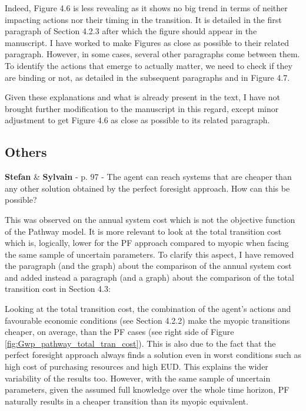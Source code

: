 \documentclass[12pt,a4paper]{article}
\begin{document}
\noindent Indeed, Figure 4.6 is less revealing as it shows no big trend in terms of neither impacting actions nor their timing in the transition.  It is detailed in the first paragraph of Section 4.2.3 after which the figure should appear in the manuscript. I have worked to make Figures as close as possible to their related paragraph. However, in some cases, several other paragraphs come between them. To identify the actions that emerge to actually matter, we need to check if they are binding or not, as detailed in the subsequent paragraphs and in Figure 4.7.

Given these explanations and what is already present in the text, I have not brought further modification to the manuscript in this regard, except minor adjustment to get Figure 4.6 as close as possible to its related paragraph.


\subsection{Others}

\begin{mdframed}[style=comment] %
{\color{teal} \textbf{Stefan}} \& {\color{purple} \textbf{Sylvain}} - p. 97 - The agent can reach systems that are cheaper than any other solution obtained by the perfect foresight approach. How can this be possible?
\end{mdframed}

\noindent This was observed on the annual system cost which is not the objective function of the Pathway model. It is more relevant to look at the total transition cost which is, logically, lower for the PF approach compared to myopic when facing the same sample of uncertain parameters. To clarify this aspect, I have removed the paragraph (and the graph) about the comparison of the annual system cost and added instead a paragraph (and a graph) about the comparison of the total transition cost {\color{blue}in Section 4.3}:

\begin{mdframed}[style=manuscript] %
Looking at the total transition cost, the combination of the agent's actions and favourable economic conditions (see Section 4.2.2) make the myopic transitions cheaper, on average, than the PF cases (see right side of Figure \ref{fig:Gwp_pathway_total_tran_cost}). This is also due to the fact that the perfect foresight approach always finds a solution even in worst conditions such as high cost of purchasing resources and high EUD. This explains the wider variability of the results too. However, with the same sample of uncertain parameters, given the assumed full knowledge over the whole time horizon, PF naturally results in a cheaper transition than its myopic equivalent.
\end{mdframed}
\end{document}
